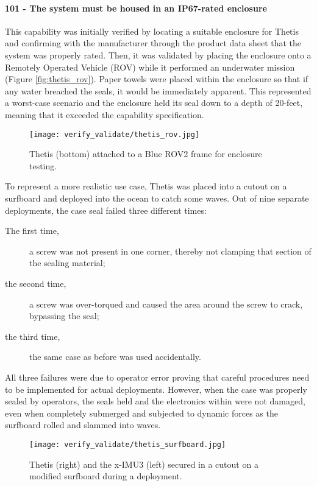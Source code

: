 \paragraph*{101 - The system must be housed in an IP67-rated enclosure} This capability was initially verified by locating a suitable enclosure for Thetis and confirming with the manufacturer through the product data sheet that the system was properly rated.
Then, it was validated by placing the enclosure onto a Remotely Operated Vehicle (ROV) while it performed an underwater mission (Figure \ref{fig:thetis_rov}).
Paper towels were placed within the enclosure so that if any water breached the seals, it would be immediately apparent.
This represented a worst-case scenario and the enclosure held its seal down to a depth of 20-feet, meaning that it exceeded the capability specification.

\begin{figure}[h!]
    \caption[ROV setup]{Thetis (bottom) attached to a Blue ROV2 frame for enclosure testing.}
    \centering
    \texttt{[image: verify\_validate/thetis\_rov.jpg]}
\end{figure}

To represent a more realistic use case, Thetis was placed into a cutout on a surfboard and deployed into the ocean to catch some waves.
Out of nine separate deployments, the case seal failed three different times:

\begin{description}
    \item[The first time,] a screw was not present in one corner, thereby not clamping that section of the sealing material;
    \item[the second time, ] a screw was over-torqued and caused the area around the screw to crack, bypassing the seal;
    \item[the third time,] the same case as before was used accidentally.
\end{description}

All three failures were due to operator error proving that careful procedures need to be implemented for actual deployments.
However, when the case was properly sealed by operators, the seals held and the electronics within were not damaged, even when completely submerged and subjected to dynamic forces as the surfboard rolled and slammed into waves.

\begin{figure}[h!]
    \caption[Surfboard setup]{Thetis (right) and the x-IMU3 (left) secured in a cutout on a modified surfboard during a deployment.}
    \centering
    \texttt{[image: verify\_validate/thetis\_surfboard.jpg]}
\end{figure}

